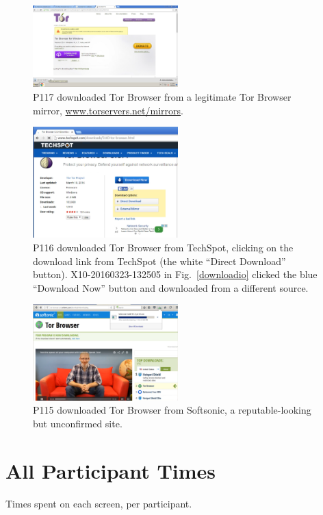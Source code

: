 \documentclass[USenglish,oneside,twocolumn]{article}
\begin{document}
\begin{figure}[h]
\includegraphics[width=0.5\textwidth]{../experiment/processing/bad-participants/X32-20160328-134531-mirror.png}
\caption{P117 downloaded Tor Browser from a legitimate Tor Browser mirror, \url{www.torservers.net/mirrors}.}
\label{mirror}
\end{figure}

\begin{figure}[h]
\includegraphics[width=0.5\textwidth]{../experiment/processing/bad-participants/20160323-133257-techspot.png}
\caption{P116 downloaded Tor Browser from TechSpot, clicking on the download link from 
TechSpot (the white ``Direct Download'' button). X10-20160323-132505 in Fig.~\ref{downloadio} clicked the blue ``Download Now'' button and downloaded from a different source.}
\label{techspot}
\end{figure}

\begin{figure}[h]
\includegraphics[width=0.5\textwidth]{../experiment/processing/bad-participants/20160330-161511-softsonic.png}
\caption{P115 downloaded Tor Browser from Softsonic, a reputable-looking but
unconfirmed site.}
\label{softsonic}
\end{figure}

\section{All Participant Times}
\label{all-participant-times}

\begin{table}

\caption{
Times spent on each screen, per participant.
}
\label{table:all-participant-times}
\end{table}
\end{document}
